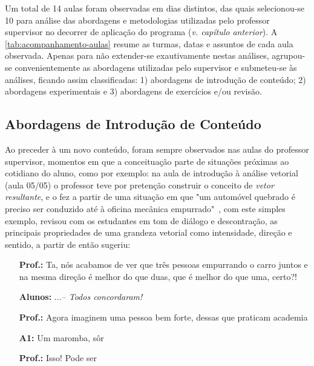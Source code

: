 Um total de 14 aulas foram observadas em dias distintos, das quais selecionou-se 10 para análise das abordagens e metodologias utilizadas pelo professor supervisor no decorrer de aplicação do programa (\textit{v. capítulo anterior}). A \autoref{tab:acompanhamento-aulas} resume as turmas, datas e assuntos de cada aula observada. Apenas para não extender-se exautivamente nestas análises, agrupou-se convenientemente as abordagens utilizadas pelo supervisor e submeteu-se às análises, ficando assim classificadas: 1) abordagens de introdução de conteúdo; 2) abordagens experimentais e 3) abordagens de exercícios e/ou revisão.

\subsection{Abordagens de Introdução de Conteúdo} %
\label{sub:Abordagens de Introdução de Conteúdo}
Ao preceder à um novo conteúdo, foram sempre observados nas aulas do professor supervisor, momentos em que a conceituação parte de situações próximas ao cotidiano do aluno, como por exemplo: na aula de introdução à análise vetorial (aula 05/05) o professor teve por pretenção construir o conceito de \textit{vetor resultante}, e o fez a partir de uma situação em que "um automóvel quebrado é preciso ser conduzido até à oficina mecânica empurrado"~, com este simples exemplo, revisou com os estudantes em tom de diálogo e descontração, as principais propriedades de uma grandeza vetorial como intensidade, direção e sentido, a partir de então sugeriu:

\begin{center}
	\begin{minipage}{.9\textwidth}
		\begin{itemize}
			\item [\textbf{Prof.:}] Ta, nós acabamos de ver que três pessoas empurrando o carro juntos e na mesma direção é melhor do que duas, que é melhor do que uma, certo?!
			\item [\textbf{Alunos:}] ...\textit{-- Todos concordaram!}
			\item [\textbf{Prof.:}] Agora imaginem uma pessoa bem forte, dessas que praticam academia 
			\item [\textbf{A1:}] Um maromba, sôr
			\item [\textbf{Prof.:}] Isso! Pode ser
		\end{itemize}			
	\end{minipage}	
\end{center}

